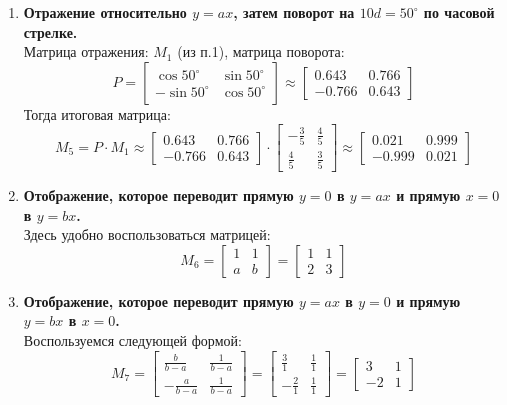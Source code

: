 \begin{enumerate}
  \item \textbf{Отражение относительно $y = ax$, затем поворот на $10d = 50^\circ$ по часовой стрелке.}\\
  Матрица отражения: $M_1$ (из п.1), матрица поворота:
  \[
    P = \begin{bmatrix}
      \cos 50^\circ & \sin 50^\circ \\
      -\sin 50^\circ & \cos 50^\circ
    \end{bmatrix} \approx
    \begin{bmatrix}
      0.643 & 0.766 \\
      -0.766 & 0.643
    \end{bmatrix}
  \]
  Тогда итоговая матрица:
  \[
    M_5 = P \cdot M_1 \approx
    \begin{bmatrix}
      0.643 & 0.766 \\
      -0.766 & 0.643
    \end{bmatrix} \cdot
    \begin{bmatrix}
      -\frac{3}{5} & \frac{4}{5} \\
      \frac{4}{5} & \frac{3}{5}
    \end{bmatrix} \approx
    \begin{bmatrix}
      0.021 & 0.999 \\
      -0.999 & 0.021
    \end{bmatrix}
  \]


\item \textbf{Отображение, которое переводит прямую $y = 0$ в $y = ax$ и прямую $x = 0$ в $y = bx$.} \\
  Здесь удобно воспользоваться матрицей:
  \[
    M_6 = \begin{bmatrix}
      1 & 1 \\
      a & b
    \end{bmatrix} =
    \begin{bmatrix}
      1 & 1 \\
      2 & 3
    \end{bmatrix}
  \]

  \item \textbf{Отображение, которое переводит прямую $y = ax$ в $y = 0$ и прямую $y = bx$ в $x = 0$.}\\
  Воспользуемся следующей формой:
  \[
    M_7 =
    \begin{bmatrix}
      \frac{b}{b - a} & \frac{1}{b - a} \\
      -\frac{a}{b - a} & \frac{1}{b - a}
    \end{bmatrix} =
    \begin{bmatrix}
      \frac{3}{1} & \frac{1}{1} \\
      -\frac{2}{1} & \frac{1}{1}
    \end{bmatrix} =
    \begin{bmatrix}
      3 & 1 \\
      -2 & 1
    \end{bmatrix}
  \]


\end{enumerate}

